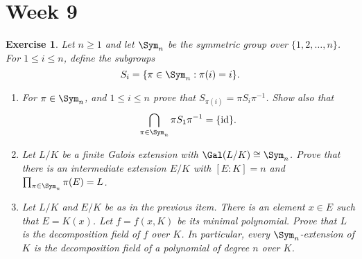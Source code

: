 \documentclass[a4paper,10pt,reqno]{amsart}
\newtheorem{ex}{Exercise}[section]
\begin{document}
\newpage

\section{Week 9}

\begin{ex}
\label{9.1}
Let $n \geq 1$ and let $\Sym_n$ be the symmetric group over $\{1, 2, \ldots, n \}$. For $1 \leq i \leq n$, define the subgroups
\[
S_i = \{ \pi \in \Sym_n : \pi(i) = i \}.
\]
\begin{enumerate}[label=(\roman*)]
\item For $\pi \in \Sym_n$, and $1 \leq i \leq n$ prove that $S_{\pi(i)} = \pi S_i\pi^{-1}$. Show also that
\[
\bigcap_{\pi \in \Sym_n} \pi S_1\pi^{-1} = \{ \mathrm{id} \}.
\]
\item Let $L/K$ be a finite Galois extension with $\Gal(L/K) \cong \Sym_n$. Prove that there is an intermediate extension $E/K$ with $[E:K] = n$ and $\prod_{\pi \in \Sym_n} \pi(E) = L$.
\item Let $L/K$ and $E/K$ be as in the previous item. There is an element $x \in E$ such that $E = K(x)$. Let $f = f(x,K)$ be its minimal polynomial. Prove that $L$ is the decomposition field of $f$ over $K$. In particular, every $\Sym_n$-extension of $K$ is the decomposition field of a polynomial of degree $n$ over $K$.
\end{enumerate}

\end{ex}
\end{document}
